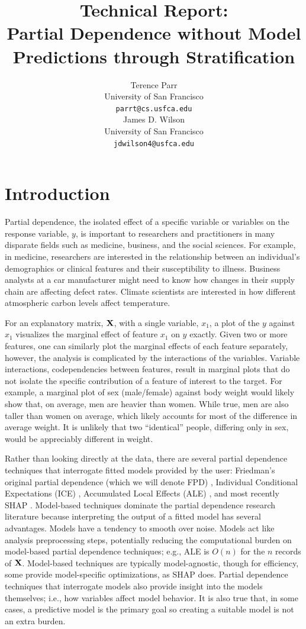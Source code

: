 \documentclass{article}
\title{Technical Report:\\
Partial Dependence without Model Predictions through Stratification}
\author{%
  Terence Parr \\
  University of San Francisco\\
  \texttt{parrt@cs.usfca.edu} \\
  \And
  James D. Wilson \\
  University of San Francisco\\
  \texttt{jdwilson4@usfca.edu} \\
}
\begin{document}
\maketitle

\begin{abstract}
\end{abstract}

\section{Introduction}

Partial dependence, the isolated effect of a specific variable or variables on the response variable, $y$, is important to researchers and practitioners in many disparate fields such as medicine, business, and the social sciences. For example, in medicine, researchers are interested in the relationship between an individual's demographics or clinical features and their susceptibility to illness. Business analysts at a car manufacturer might need to know how changes in their supply chain are affecting defect rates. Climate scientists are interested in how different atmospheric carbon levels affect temperature.

For an explanatory matrix, $\bf X$, with a single variable, $x_1$, a plot of the $y$ against $x_1$ visualizes the marginal effect of feature $x_1$ on $y$ exactly. Given two or more features, one can similarly plot the marginal effects of each feature separately, however, the analysis is complicated by the interactions of the variables.   Variable interactions, codependencies between features, result in marginal plots that do not isolate the specific contribution of a feature of interest to the target. For example, a marginal plot of sex (male/female) against body weight would likely show that, on average, men are heavier than women. While true, men are also taller than women on average, which likely accounts for most of the difference in average weight. It is unlikely that two ``identical'' people, differing only in sex, would be appreciably different in weight.  

Rather than looking directly at the data, there are several partial dependence techniques that interrogate fitted models provided by the user: Friedman's original partial dependence (which we will denote FPD) \citet{PDP}, Individual Conditional Expectations (ICE) \citet{ICE}, Accumulated Local Effects (ALE) \citet{ALE}, and most recently SHAP \citet{shap}.  Model-based techniques dominate the partial dependence research literature because interpreting the output of a fitted model  has several advantages. Models have a tendency to smooth over noise. Models act like analysis preprocessing steps, potentially reducing the computational burden on model-based partial dependence techniques; e.g., ALE is $O(n)$ for the $n$ records of $\bf X$. Model-based techniques are typically model-agnostic, though for efficiency, some provide model-specific optimizations, as SHAP does. Partial dependence techniques that interrogate models also provide insight into the models themselves; i.e., how variables affect model behavior.  It is also true that, in some cases, a predictive model is the primary goal so creating a suitable model is not an extra burden.
\end{document}

